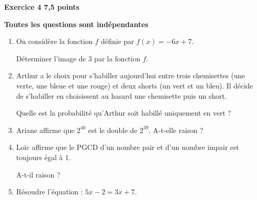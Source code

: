\textbf{Exercice 4 \hfill 7,5 points}

\medskip

\textbf{Toutes les questions sont indépendantes}

\medskip

\begin{enumerate}
\item On considère la fonction $f$ définie par $f(x) = - 6x + 7$.

Déterminer l'image de 3 par la fonction $f$.
\item  Arthur a le choix pour s'habiller aujourd'hui entre trois chemisettes (une verte, une bleue et une rouge) et deux shorts (un vert et un bleu). Il décide de s'habiller en choisissent au hasard une chemisette puis un short.

Quelle est la probabilité qu'Arthur soit habillé uniquement en vert ?
\item  Ariane affirme que $2^{40}$ est le double de $2^{39}$.  A-t-elle raison ?
\item  Loïc affirme que le PGCD d'un nombre pair et d'un nombre impair est toujours égal à 1.

A-t-il raison ?
\item  Résoudre l'équation :  $5x - 2 = 3x + 7$.
\end{enumerate}

\vspace{0,5cm}

